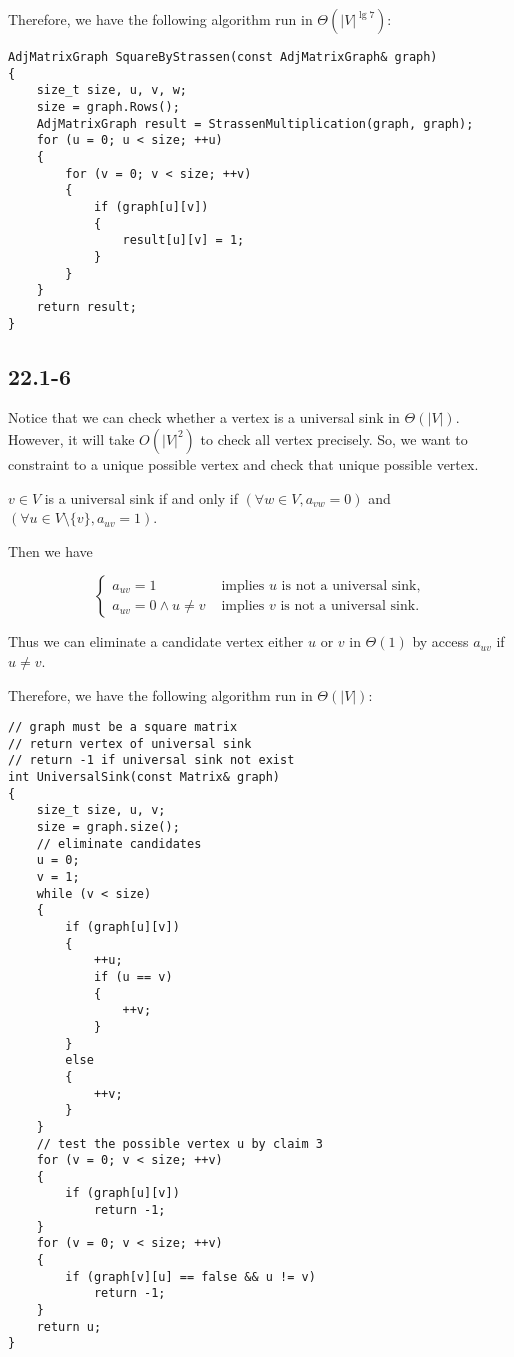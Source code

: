 Therefore, we have the following algorithm run in $\Theta(|V|^{\lg 7})$:

\begin{verbatim}
AdjMatrixGraph SquareByStrassen(const AdjMatrixGraph& graph)
{
    size_t size, u, v, w;
    size = graph.Rows();
    AdjMatrixGraph result = StrassenMultiplication(graph, graph);
    for (u = 0; u < size; ++u)
    {
        for (v = 0; v < size; ++v)
        {
            if (graph[u][v])
            {
                result[u][v] = 1;
            }
        }
    }
    return result;
}
\end{verbatim}

\subsection*{22.1-6}

Notice that we can check whether a vertex is a universal sink in $\Theta(|V|)$.
However, it will take $O(|V|^2)$ to check all vertex precisely.
So, we want to constraint to a unique possible vertex and check that unique possible vertex.

\begin{claim}
    $v \in V$ is a universal sink if and only if
    $(\forall w \in V, a_{vw} = 0)$
    and 
    $(\forall u \in V \setminus \{ v \}, a_{uv} = 1)$. 
\end{claim}

Then we have

\begin{equation*}
    \begin{cases}
        a_{uv} = 1 & \text{ implies $u$ is not a universal sink,} \\
        a_{uv} = 0 \wedge u \neq v & \text{ implies $v$ is not a universal sink.}
    \end{cases}
\end{equation*}

Thus we can eliminate a candidate vertex either $u$ or $v$ in $\Theta(1)$ 
by access $a_{uv}$ if $u \neq v$.

Therefore, we have the following algorithm run in $\Theta(|V|)$:

\begin{verbatim}
// graph must be a square matrix
// return vertex of universal sink
// return -1 if universal sink not exist
int UniversalSink(const Matrix& graph)
{
    size_t size, u, v;
    size = graph.size();
    // eliminate candidates
    u = 0;
    v = 1;
    while (v < size)
    {
        if (graph[u][v])
        {
            ++u;
            if (u == v)
            {
                ++v;
            }
        }
        else
        {
            ++v;
        }
    }
    // test the possible vertex u by claim 3
    for (v = 0; v < size; ++v)
    {
        if (graph[u][v])
            return -1;
    }
    for (v = 0; v < size; ++v)
    {
        if (graph[v][u] == false && u != v)
            return -1;
    }
    return u;
}
\end{verbatim}

